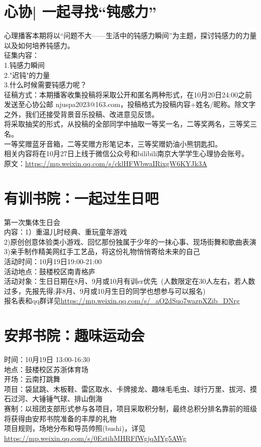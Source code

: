 \documentclass[letterpaper, 12pt]{article}
\begin{document}
\begin{multicols}{2}
\section{心协| 一起寻找“钝感力”}
心理播客本期将以“问题不大——生活中的钝感力瞬间”为主题，探讨钝感力的力量以及如何培养钝感力。\\
征集内容：\\
1.钝感力瞬间\\
2."迟钝"的力量\\
3.什么时候需要钝感力呢？\\
征稿方式：本期播客收集投稿将采取公开和匿名两种形式，在10月20日24:00之前发送至心协公邮 njuspa2023@163.com，投稿格式为投稿内容+姓名/昵称。除文字之外，我们还接受背景音乐投稿、改进意见反馈。\\
将采取抽奖的形式，从投稿的全部同学中抽取一等奖一名，二等奖两名，三等奖三名。\\
一等奖赠蓝牙音箱，二等奖赠方形笔记本，三等奖赠奶油小熊钥匙扣。\\
相关内容将在10月27日上线于微信公众号和bilibili南京大学学生心理协会账号。\\
原文：\url{https://mp.weixin.qq.com/s/cklHFWbwaIRixgW6KYJk3A}
\section{有训书院：一起过生日吧}
第一次集体生日会\\
内容：1）重温儿时经典、重玩童年游戏\\
2)原创创意体验类小游戏、回忆那份独属于少年的一抹心事、现场街舞和歌曲表演\\
3)亲手制作精美网红手工艺品，将这份礼物悄悄寄给未来的自己\\
活动时间：10月19日19:00-21:00\\
活动地点：鼓楼校区南青格庐\\
活动对象：生日日期在8月、9月或10月有训er优先~(人数限定在30人左右，若人数过多，先报先得;非8月、9月或10月生日的同学也想参与可以报名)\\
报名表和qq群详见\url{https://mp.weixin.qq.com/s/_aO2dSuo7wazpXZib_DNrg}

\section{安邦书院：趣味运动会}
时间：10月19日 13:00-16:30\\
地点：鼓楼校区苏浙体育场\\
开场：云南打跳舞\\
项目：袋鼠跳、木板鞋、雷区取水、卡牌接龙、趣味毛毛虫、球行万里、拔河、摸石过河、大锤锤气球、排山倒海\\
赛制：以班团支部形式参与各项目，项目采取积分制，最终总积分排名靠前的班级将获得由安邦书院准备的丰厚的礼物\\
项目规则，场地分布和导员帅照(bushi)，详见\url{https://mp.weixin.qq.com/s/0EztihMHRFfWgjqMYg5AWg}


\end{multicols}
\end{document}
